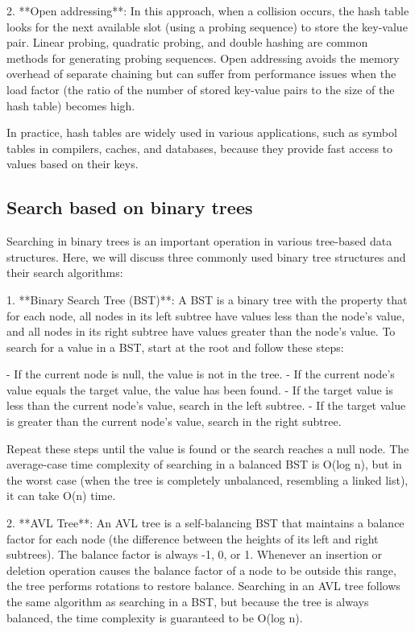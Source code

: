 \documentclass{article}
\begin{document}
2. **Open addressing**: In this approach, when a collision occurs, the hash table looks for the next available slot (using a probing sequence) to store the key-value pair. Linear probing, quadratic probing, and double hashing are common methods for generating probing sequences. Open addressing avoids the memory overhead of separate chaining but can suffer from performance issues when the load factor (the ratio of the number of stored key-value pairs to the size of the hash table) becomes high.

In practice, hash tables are widely used in various applications, such as symbol tables in compilers, caches, and databases, because they provide fast access to values based on their keys.


\subsection{Search based on binary trees}

Searching in binary trees is an important operation in various tree-based data structures. Here, we will discuss three commonly used binary tree structures and their search algorithms:

1. **Binary Search Tree (BST)**: A BST is a binary tree with the property that for each node, all nodes in its left subtree have values less than the node's value, and all nodes in its right subtree have values greater than the node's value. To search for a value in a BST, start at the root and follow these steps:

   - If the current node is null, the value is not in the tree.
   - If the current node's value equals the target value, the value has been found.
   - If the target value is less than the current node's value, search in the left subtree.
   - If the target value is greater than the current node's value, search in the right subtree.

   Repeat these steps until the value is found or the search reaches a null node. The average-case time complexity of searching in a balanced BST is O(log n), but in the worst case (when the tree is completely unbalanced, resembling a linked list), it can take O(n) time.

2. **AVL Tree**: An AVL tree is a self-balancing BST that maintains a balance factor for each node (the difference between the heights of its left and right subtrees). The balance factor is always -1, 0, or 1. Whenever an insertion or deletion operation causes the balance factor of a node to be outside this range, the tree performs rotations to restore balance. Searching in an AVL tree follows the same algorithm as searching in a BST, but because the tree is always balanced, the time complexity is guaranteed to be O(log n).
\end{document}
